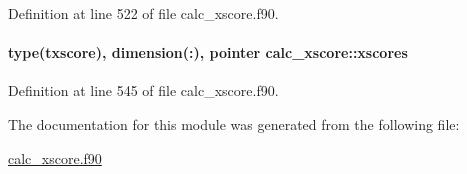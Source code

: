 Definition at line 522 of file calc\-\_\-xscore.\-f90.

\hypertarget{classcalc__xscore_ab5912d1fa25efa1a253fc3c295329b57}{
\paragraph[{xscores}]{\setlength{\rightskip}{0pt plus 5cm}type({\bf txscore}), dimension(\-:), pointer calc\-\_\-xscore\-::xscores}}\label{classcalc__xscore_ab5912d1fa25efa1a253fc3c295329b57}


Definition at line 545 of file calc\-\_\-xscore.\-f90.



The documentation for this module was generated from the following file\-:\begin{DoxyCompactItemize}
\item 
\hyperlink{calc__xscore_8f90}{calc\-\_\-xscore.\-f90}\end{DoxyCompactItemize}

